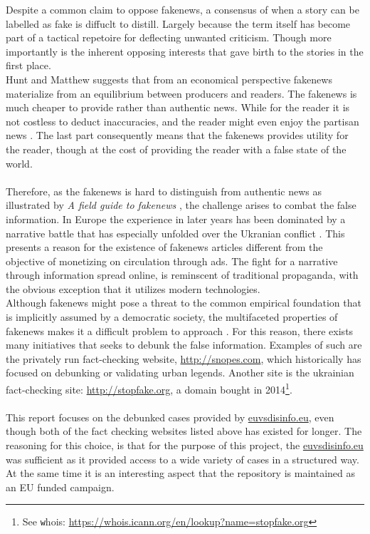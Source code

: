 \documentclass{article}
\begin{document}
Despite a common claim to oppose fakenews, a consensus of when a story can be labelled as fake is diffuclt to distill. Largely because the term itself has become part of a tactical repetoire for deflecting unwanted criticism. Though more importantly is the inherent opposing interests that gave birth to the stories in the first place. \\ Hunt and Matthew suggests that from an economical perspective fakenews materialize from an equilibrium between producers and readers. The fakenews is much cheaper to provide rather than authentic news. While for the reader it is not costless to deduct inaccuracies, and the reader might even enjoy the partisan news \cite{allcott2017social}. The last part consequently means that the fakenews provides utility for the reader, though at the cost of providing the reader with a false state of the world.
\\\\
Therefore, as the fakenews is hard to distinguish from authentic news as illustrated by {\it A field guide to fakenews} \cite{field_guide_fakenews}, the challenge arises to combat the false information. In Europe the experience in later years has been dominated by a narrative battle that has especially unfolded over the Ukranian conflict \cite{khaldarova2016fake}. This presents a reason for the existence of fakenews articles different from the objective of monetizing on circulation through ads. The fight for a narrative through information spread online, is reminscent of traditional propaganda, with the obvious exception that it utilizes modern technologies.\\
Although fakenews might pose a threat to the common empirical foundation that is implicitly assumed by a democratic society, the multifaceted properties of fakenews makes it a difficult problem to approach \cite{the_economist}. For this reason, there exists many initiatives that seeks to debunk the false information.
Examples of such are the privately run fact-checking website, \url{http://snopes.com}, which historically has focused on debunking or validating urban legends. Another site is the ukrainian fact-checking site: \url{http://stopfake.org}, a domain bought in 2014\footnote{See {\texttt whois}: \url{https://whois.icann.org/en/lookup?name=stopfake.org}}.
\\\\
This report focuses on the debunked cases provided by \href{https://www.euvsdisinfo.eu}{euvsdisinfo.eu}, even though both of the fact checking websites listed above has existed for longer. The reasoning for this choice, is that for the purpose of this project, the \href{https://www.euvsdisinfo.eu}{euvsdisinfo.eu} was sufficient as it provided access to a wide variety of cases in a structured way. At the same time it is an interesting aspect that the repository is maintained as an EU funded campaign.
\end{document}
